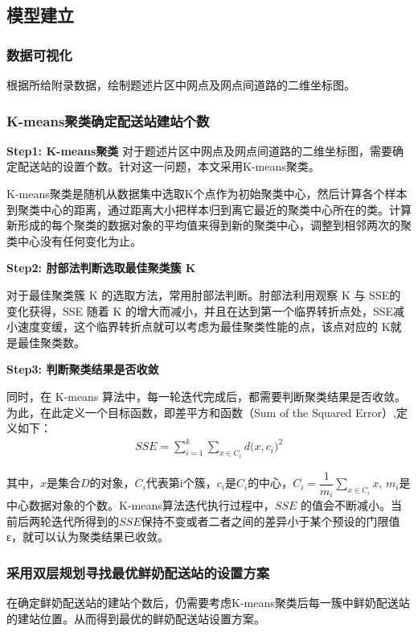 \documentclass[withoutpreface,bwprint]{cumcmthesis} %
\begin{document}
	\subsection{模型建立}


	\subsubsection{数据可视化}
	根据所给附录数据，绘制题述片区中网点及网点间道路的二维坐标图。
	\subsubsection{K-means聚类确定配送站建站个数}
	\textbf{Step1: K-means聚类}
	对于题述片区中网点及网点间道路的二维坐标图，需要确定配送站的设置个数。针对这一问题，本文采用K-means聚类。
	
	K-means聚类是随机从数据集中选取K个点作为初始聚类中心，然后计算各个样本到聚类中心的距离，通过距离大小把样本归到离它最近的聚类中心所在的类。计算新形成的每个聚类的数据对象的平均值来得到新的聚类中心，调整到相邻两次的聚类中心没有任何变化为止。
	
	\textbf{Step2: 肘部法判断选取最佳聚类簇 K }
	
	对于最佳聚类簇 K 的选取方法，常用肘部法判断。肘部法利用观察 K 与 SSE的变化获得，SSE 随着 K 的增大而减小，并且在达到第一个临界转折点处，SSE减小速度变缓，这个临界转折点就可以考虑为最佳聚类性能的点，该点对应的 K就是最佳聚类数。
	
	\textbf{Step3: 判断聚类结果是否收敛}
	
	同时，在 K-means 算法中，每一轮迭代完成后，都需要判断聚类结果是否收敛。为此，在此定义一个目标函数，即差平方和函数（Sum of the Squared Error）,定义如下：
	\begin{align*}
		SSE=\sum_{i=1}^{k}{\sum_{x \in {{C}_{i}}}^{}{d(x,{{c}_{i}}{{)}^{2}}}}
	\end{align*}
	
	其中，$x$是集合$D$的对象，$C_{i}$代表第i个簇，$c_{i}$是$C_{i}$的中心，${C_i} = \dfrac{1}{{{m_i}}}\sum\limits_{x \in {C_i}} x $, $m_{i}$是中心数据对象的个数。K-means算法迭代执行过程中，$SSE$ 的值会不断减小。当前后两轮迭代所得到的$SSE$保持不变或者二者之间的差异小于某个预设的门限值ε，就可以认为聚类结果已收敛。
	
	\subsubsection{采用双层规划寻找最优鲜奶配送站的设置方案}
	在确定鲜奶配送站的建站个数后，仍需要考虑K-means聚类后每一簇中鲜奶配送站的建站位置。从而得到最优的鲜奶配送站设置方案。
	
\end{document}
